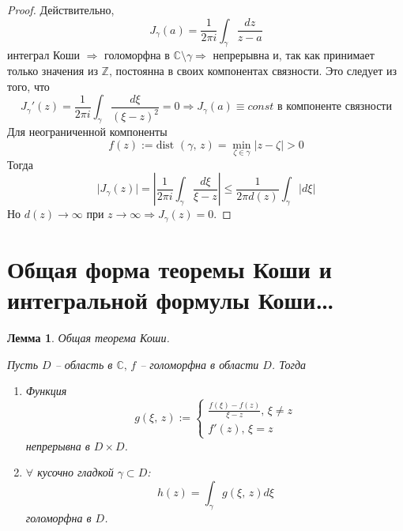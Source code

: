 \documentclass[a4paper,12pt]{article}
\renewcommand{\leq}{\ensuremath{\leqslant}}
\theoremstyle{plain}
\newtheorem{lemma}{Лемма}[section]
\theoremstyle{definition}
\theoremstyle{remark}
\begin{document}
\begin{proof}
	Действительно,
	\[
		J_\gamma(a) = \frac{1}{2\pi i}\int_\gamma\frac{dz}{z - a}
	\]
	интеграл Коши $\Rightarrow$ голоморфна в $\mathbb{C} \setminus \gamma \Rightarrow$ непрерывна и, так как принимает только значения из $\mathbb{Z}$, постоянна в своих компонентах связности. Это следует из того, что
	\[
		J_\gamma'(z) = \frac{1}{2\pi i} \int_\gamma\frac{d\xi}{(\xi - z)^2} = 0 \Rightarrow J_\gamma(a) \equiv const \text{ в компоненте связности}
	\]
	Для неограниченной компоненты
	\[
		f(z) := \text{dist }(\gamma,\, z) = \min_{\zeta \in \gamma}\vert z - \zeta\vert > 0
	\]
	Тогда
	\[
		\vert J_\gamma(z)\vert = \left\vert\frac{1}{2\pi i}\int_\gamma\frac{d\xi}{\xi - z}\right\vert \leq \frac{1}{2\pi d(z)}\int_\gamma\vert d\xi\vert
	\]
	Но $d(z) \to \infty$ при $z \to \infty \Rightarrow J_\gamma(z) = 0$.
\end{proof}

\section{Общая форма теоремы Коши и интегральной формулы Коши\dots}
\begin{lemma}
	Общая теорема Коши.

	Пусть $D$ -- область в $\mathbb{C},\, f$ -- голоморфна в области $D$. Тогда
	\begin{enumerate}
		\item Функция
		      \[
			      g(\xi,\, z) := \begin{cases}
				      \frac{f(\xi) - f(z)}{\xi - z},\, \xi \neq z \\
				      f'(z),\, \xi = z
			      \end{cases}
		      \]
		      непрерывна в $D \times D$.
		\item $\forall$ кусочно гладкой $\gamma \subset D$:
		      \[
			      h(z) = \int_\gamma g(\xi,\, z)d\xi
		      \]
		      голоморфна в $D$.
	\end{enumerate}
\end{lemma}
\end{document}
